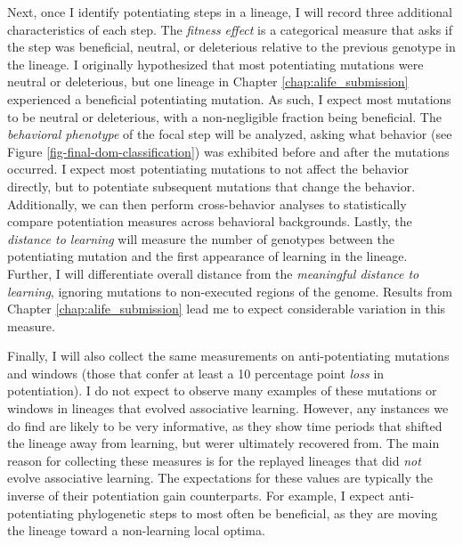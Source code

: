 Next, once I identify potentiating steps in a lineage, I will record three additional characteristics of each step. 
The \textit{fitness effect} is a categorical measure that asks if the step was beneficial, neutral, or deleterious relative to the previous genotype in the lineage.  
I originally hypothesized that most potentiating mutations were neutral or deleterious, but one lineage in Chapter \ref{chap:alife_submission} experienced a beneficial potentiating mutation.
As such, I expect most mutations to be neutral or deleterious, with a non-negligible fraction being beneficial. 
The \textit{behavioral phenotype} of the focal step will be analyzed, asking what behavior (see Figure \ref{fig-final-dom-classification}) was exhibited before and after the mutations occurred. 
I expect most potentiating mutations to not affect the behavior directly, but to potentiate subsequent mutations that change the behavior. 
Additionally, we can then perform cross-behavior analyses to statistically compare potentiation measures across behavioral backgrounds. 
Lastly, the \textit{distance to learning} will measure the number of genotypes between the potentiating mutation and the first appearance of learning in the lineage. 
Further, I will differentiate overall distance from the \textit{meaningful distance to learning}, ignoring mutations to non-executed regions of the genome. 
Results from Chapter \ref{chap:alife_submission} lead me to expect considerable variation in this measure. 

Finally, I will also collect the same measurements on anti-potentiating mutations and windows (those that confer at least a 10 percentage point \textit{loss} in potentiation).
I do not expect to observe many examples of these mutations or windows in lineages that evolved associative learning. 
However, any instances we do find are likely to be very informative, as they show time periods that shifted the lineage away from learning, but werer ultimately recovered from. 
The main reason for collecting these measures is for the replayed lineages that did \textit{not} evolve associative learning. 
The expectations for these values are typically the inverse of their potentiation gain counterparts. 
For example, I expect anti-potentiating phylogenetic steps to most often be beneficial, as they are moving the lineage toward a non-learning local optima. 




